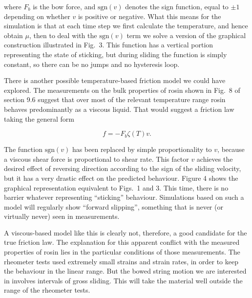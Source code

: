   where $F_b$ is the bow force, and $\mathrm{sgn}(v)$ denotes the sign 
  function, equal to $\pm1$ depending on whether $v$ is positive or negative. 
  What this means for the simulation is that at each time step we first 
  calculate the temperature, and hence obtain $\mu$, then to deal with the 
  $\mathrm{sgn}(v)$ term we solve a version of the graphical construction 
  illustrated in Fig.\ 3. This function has a vertical portion representing the 
  state of sticking, but during sliding the function is simply constant, so 
  there can be no jumps and no hysteresis loop. 


  There is another possible temperature-based friction model we could have 
  explored. The measurements on the bulk properties of rosin shown in Fig.\ 8 
  of section 9.6 suggest that over most of the relevant temperature range rosin 
  behaves predominantly as a viscous liquid. That would suggest a friction law 
  taking the general form 

  $$f=-F_b \zeta(T) v . \tag{2}$$ 

  The function $\mathrm{sgn}(v)$ has been replaced by simple proportionality to 
  $v$, because a viscous shear force is proportional to shear rate. This factor 
  $v$ achieves the desired effect of reversing direction according to the sign 
  of the sliding velocity, but it has a very drastic effect on the predicted 
  behaviour. Figure 4 shows the graphical representation equivalent to Figs.\ 1 
  and 3. This time, there is no barrier whatever representing ``sticking'' 
  behaviour. Simulations based on such a model will regularly show ``forward 
  slipping'', something that is never (or virtually never) seen in 
  measurements. 


  A viscous-based model like this is clearly not, therefore, a good candidate 
  for the true friction law. The explanation for this apparent conflict with 
  the measured properties of rosin lies in the particular conditions of those 
  measurements. The rheometer tests used extremely small strains and strain 
  rates, in order to keep the behaviour in the linear range. But the bowed 
  string motion we are interested in involves intervals of gross sliding. This 
  will take the material well outside the range of the rheometer tests. 

